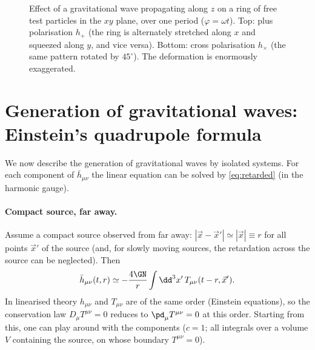 \begin{figure}[ht]
\centering
{}
\caption{Effect of a gravitational wave propagating along $z$ on a ring of free test particles in the $xy$ plane, over one period ($\varphi=\omega t$). Top: plus polarisation $h_+$ (the ring is alternately stretched along $x$ and squeezed along $y$, and vice versa). Bottom: cross polarisation $h_\times$ (the same pattern rotated by $45^\circ$). The deformation is enormously exaggerated.}
\label{fig:ring}
\end{figure}

\section{Generation of gravitational waves: Einstein's quadrupole formula}

We now describe the generation of gravitational waves by isolated systems. For each component of $\bar h_{\mu\nu}$ the linear equation can be solved by \eqref{eq:retarded} (in the harmonic gauge).

\paragraph{Compact source, far away.} Assume a compact source observed from far away: $|\vec x-\vec x'|\simeq|\vec x|\equiv r$ for all points $\vec x'$ of the source (and, for slowly moving sources, the retardation across the source can be neglected). Then
\begin{equation}
  \bar h_{\mu\nu}(t,r)\simeq-\frac{4\GN}{r}\int\dd^3x'\,T_{\mu\nu}(t-r,\vec x').
\end{equation}
In linearised theory $h_{\mu\nu}$ and $T_{\mu\nu}$ are of the same order (Einstein equations), so the conservation law $D_\mu T^{\mu\nu}=0$ reduces to $\pd_\mu T^{\mu\nu}=0$ at this order. Starting from this, one can play around with the components ($c=1$; all integrals over a volume $V$ containing the source, on whose boundary $T^{\mu\nu}=0$).

